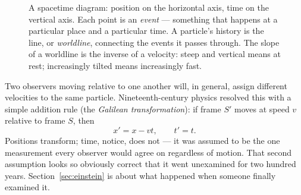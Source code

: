 \documentclass[12pt]{book}
\begin{document}
\begin{figure}[h]
\centering
{}
\caption{A spacetime diagram: position on the horizontal axis, time on the vertical axis. Each point is an \emph{event} --- something that happens at a particular place and a particular time. A particle's history is the line, or \emph{worldline}, connecting the events it passes through. The slope of a worldline is the inverse of a velocity: steep and vertical means at rest; increasingly tilted means increasingly fast.}
\label{fig:worldline}
\end{figure}

Two observers moving relative to one another will, in general, assign different velocities to the same particle. Nineteenth-century physics resolved this with a simple addition rule (the \emph{Galilean transformation}): if frame $S'$ moves at speed $v$ relative to frame $S$, then
\[
  x' = x - vt, \qquad t' = t.
\]
Positions transform; time, notice, does not --- it was assumed to be the one measurement every observer would agree on regardless of motion. That second assumption looks so obviously correct that it went unexamined for two hundred years. Section~\ref{sec:einstein} is about what happened when someone finally examined it.
\end{document}
